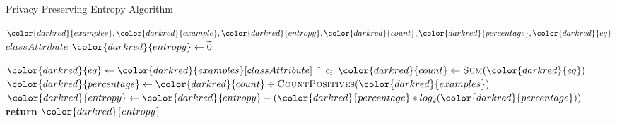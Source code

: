 \begin{algorithm}[H]
\caption{Privacy Preserving Entropy Algorithm}\label{a:id3-Entropy-pp}
\begin{algorithmic}[1]
\Require ${\color{darkred}{examples}}, {\color{darkred}{example}}, {\color{darkred}{entropy}}, {\color{darkred}{count}}, {\color{darkred}{percentage}}, {\color{darkred}{eq}}$
\renewcommand{\algorithmicrequire}{\textbf{Global Vars:}}
\Require $classAttribute$
    \State ${\color{darkred}{entropy}} \gets \enc{0}$

        \State ${\color{darkred}{eq}} \gets {\color{darkred}{examples}}[classAttribute] \heq c_i$ 
        \State ${\color{darkred}{count}} \gets \textsc{Sum}({\color{darkred}{eq}})$
        \State ${\color{darkred}{percentage}} \gets {\color{darkred}{count}} \div \textsc{CountPositives}({\color{darkred}{examples}})$
        \State ${\color{darkred}{entropy}} \gets {\color{darkred}{entropy}} - ({\color{darkred}{percentage}} * log_2 ({\color{darkred}{percentage}}))$
    \EndFor
    \State \textbf{return} ${\color{darkred}{entropy}}$
\EndProcedure
\end{algorithmic}
\end{algorithm}
